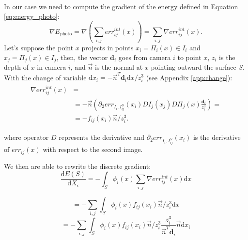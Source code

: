 In our case we need to compute the gradient of the energy defined in Equation \eqref{eq:energy_photo}:
\begin{equation}
  \nabla E_{\textrm{photo}} = \nabla (\sum_{i,j} err^{int}_{ij}(x)) = \sum_{i,j} \nabla err^{int}_{ij}(x).
\end{equation}
Let's suppose the point $x$ projects in points $x_i = \Pi_i(x) \in I_i$ and  $x_j = \Pi_j(x) \in I_j$, then, the vector $\mathbf{d}_i$ goes from camera $i$ to point $x$, $z_i$ is the depth of $x$ in camera $i$, and $\overrightarrow{n}$ is the normal at $x$ pointing outward the surface $\mathit{S}$. 
With the change of variable $\textrm{d}x_i = -\overrightarrow{n}^T \mathbf{d}_i \textrm{d}x/z_i^3$ (see Appendix \ref{app:change}):
\begin{align}
 \begin{split}
  \nabla err^{int}_{ij}(x)& = \\
  &=-\overrightarrow{n} \left( \partial_2 err_{I_i, I_{ij}^{\mathit{S}}}(x_i) DI_j(x_j) D\Pi_j(x)\frac{\mathbf{d}_i}{z_i^3}\right)=\\
  &= - f_{ij}(x_i) \overrightarrow{n}/z_i^3.
 \end{split}
\end{align}
    
where operator $D$ represents the derivative and $\partial_2 err_{I_i, I_{ij}^{\mathit{S}}}(x_i)$ is the derivative of $err_{ij}(x)$ with respect to the second image.


We then are able to rewrite the discrete gradient:
\begin{equation}
  \frac{\textrm{d}E(\mathit{S})}{\textrm{d}X_i} =  - \int_{\mathit{S}} \phi_i(x) \sum_{i,j} \nabla err^{int}_{ij}(x) \textrm{d}x 
\end{equation}

\begin{equation}
  =  - \sum_{i,j} \int_{\mathit{S}} \phi_i(x)  f_{ij}(x_i)  \overrightarrow{n}/z_i^3 \textrm{d}x 
\end{equation}
\begin{equation}
\label{eq:final}
  =  - \sum_{i,j} \int_{\mathit{S}} \phi_i(x)  f_{ij}(x_i)  \overrightarrow{n}/z_i^3 \frac{z_i^3}{\overrightarrow{n}^T \mathbf{d}_i }\overrightarrow{n} \textrm{d}x_i
\end{equation}
% 

